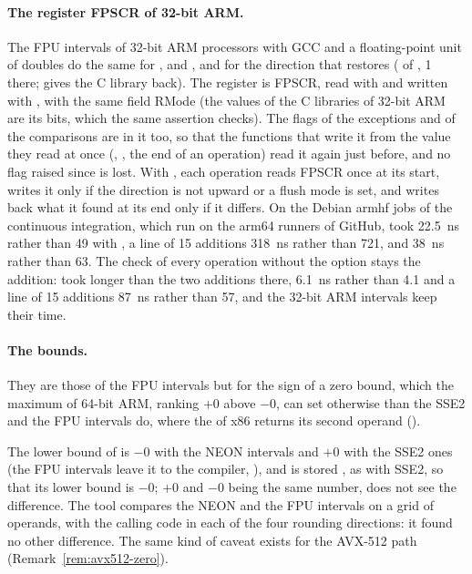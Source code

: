 \paragraph{The register FPSCR of 32-bit ARM.} The FPU intervals of 32-bit ARM
processors with GCC and a floating-point unit of doubles do the same for
,  and ,
and for the direction that  restores
( of , 1 there;
 gives the C library back). The register
is FPSCR, read with  and written with , with the same
field RMode (the  values of the C libraries of 32-bit ARM are its
bits, which the same assertion checks). The flags of the exceptions and of
the comparisons are in it too, so that the functions that write it from the
value they read at once (, , the
end of an operation) read it again just before, and no flag raised since is
lost. With , each operation reads FPSCR once
at its start, writes it only if the direction is not upward or a flush mode
is set, and writes back what it found at its end only if it differs. On the
Debian armhf jobs of the continuous integration, which run on the arm64
runners of GitHub,  took 22.5~ns rather than 49 with
, a line of 15 additions 318~ns rather than
721, and  38~ns rather than 63.\newinvfive{} The check of
every operation without the option stays the addition:  took
longer than the two additions there,  6.1~ns rather than 4.1 and
a line of 15 additions 87~ns rather than 57, and the 32-bit ARM intervals
keep their time.

\medskip
\paragraph{The bounds.} They are those of the FPU intervals but for the sign of
a zero bound, which the maximum of 64-bit ARM, ranking $+0$ above $-0$, can
set otherwise than the SSE2 and the FPU intervals do, where the 
of x86 returns its second operand ().

\begin{Rem}\label{rem:neon-zero}
The lower bound of \code{[-1, 0] * [-1, 0]} is $-0$ with the NEON intervals
and $+0$ with the SSE2 ones (the FPU intervals leave it to the compiler,
), and  is stored
, as with SSE2, so that its lower bound is $-0$; $+0$ and
$-0$ being the same number, \code{==} does not see the difference. The tool
 compares the NEON and the FPU intervals on a grid of
operands, with the calling code in each of the four rounding directions: it
found no other difference. The same kind of caveat exists for the AVX-512
path (Remark~\ref{rem:avx512-zero}).
\end{Rem}

